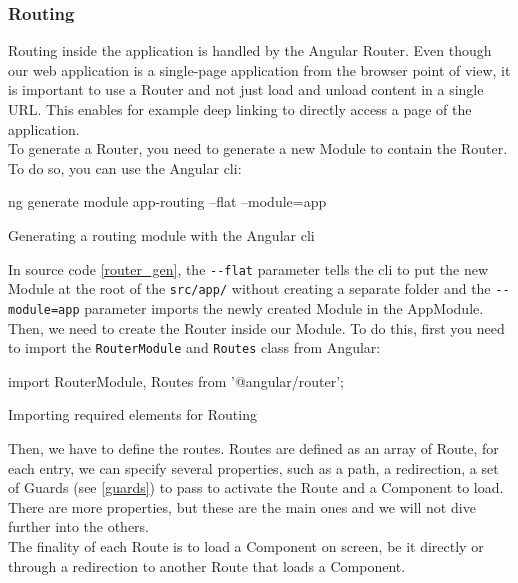 \documentclass[twoside, openright,11pt,a4paper]{book}
\newenvironment{code}{\captionsetup{type=listing}}{}
\begin{document}
\subsubsection{Routing}
Routing\cite{angular:doc:router} inside the application is handled by the Angular Router. Even though our web application is a single-page application from the browser point of view, it is important to use a Router and not just load and unload content in a single URL. This enables for example deep linking to directly access a page of the application. \\

To generate a Router, you need to generate a new Module to contain the Router. To do so, you can use the Angular \gls{cli}:
\begin{code}
	\begin{shell}
ng generate module app-routing --flat --module=app
	\end{shell}
	\caption{Generating a routing module with the Angular \gls{cli}}
	\label{router_gen}
\end{code}
In source code \ref{router_gen}, the \verb+--flat+ parameter tells the \gls{cli} to put the new Module at the root of the \verb+src/app/+ without creating a separate folder and the \verb+--module=app+ parameter imports the newly created Module in the AppModule. \\

Then, we need to create the Router inside our Module. To do this, first you need to import the \verb+RouterModule+ and \verb+Routes+ class from Angular:
\begin{code}
	\begin{inlinets}
import { RouterModule, Routes } from '@angular/router';
	\end{inlinets}
	\caption{Importing required elements for Routing}
\end{code}

Then, we have to define the routes. Routes are defined as an array of Route, for each entry, we can specify several properties, such as a path, a redirection, a set of Guards (see \ref{guards}) to pass to activate the Route and a Component to load. There are more properties, but these are the main ones and we will not dive further into the others. \\

The finality of each Route is to load a Component on screen, be it directly or through a redirection to another Route that loads a Component. \\
\end{document}
